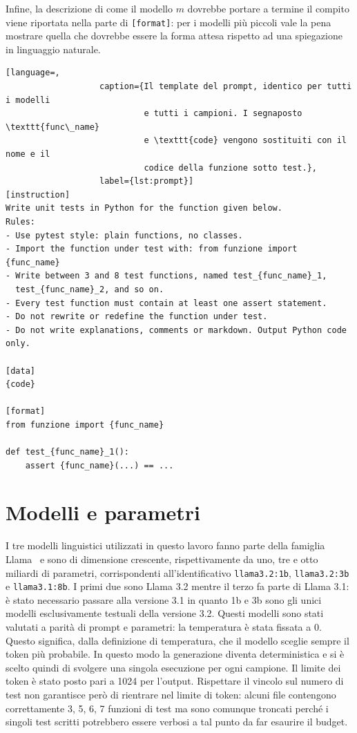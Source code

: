 Infine, la descrizione di come il modello $m$ dovrebbe portare a termine il compito viene riportata nella parte di \texttt{[format]}: per i modelli più piccoli vale la pena mostrare quella che dovrebbe essere la forma attesa rispetto ad una spiegazione in linguaggio naturale.

\begin{lstlisting}[language=,
                   caption={Il template del prompt, identico per tutti i modelli
                            e tutti i campioni. I segnaposto \texttt{func\_name}
                            e \texttt{code} vengono sostituiti con il nome e il
                            codice della funzione sotto test.},
                   label={lst:prompt}]
[instruction]
Write unit tests in Python for the function given below.
Rules:
- Use pytest style: plain functions, no classes.
- Import the function under test with: from funzione import {func_name}
- Write between 3 and 8 test functions, named test_{func_name}_1,
  test_{func_name}_2, and so on.
- Every test function must contain at least one assert statement.
- Do not rewrite or redefine the function under test.
- Do not write explanations, comments or markdown. Output Python code only.

[data]
{code}

[format]
from funzione import {func_name}

def test_{func_name}_1():
    assert {func_name}(...) == ...
\end{lstlisting}


\section{Modelli e parametri}

I tre modelli linguistici utilizzati in questo lavoro fanno parte della famiglia Llama~\cite{llama3herd} e sono di dimensione crescente, rispettivamente da uno, tre e otto miliardi di parametri, corrispondenti all'identificativo \texttt{llama3.2:1b}, \texttt{llama3.2:3b} e \texttt{llama3.1:8b}. I primi due sono Llama 3.2 mentre il terzo fa parte di Llama 3.1: è stato necessario passare alla versione 3.1 in quanto 1b e 3b sono gli unici modelli esclusivamente testuali della versione 3.2.
Questi modelli sono stati valutati a parità di prompt e parametri: la temperatura è stata fissata a 0. Questo significa, dalla definizione di temperatura, che il modello sceglie sempre il token più probabile. In questo modo la generazione diventa deterministica e si è scelto quindi di svolgere una singola esecuzione per ogni campione.
Il limite dei token è stato posto pari a 1024 per l'output. Rispettare il vincolo sul numero di test non garantisce però di rientrare nel limite di token: alcuni file contengono correttamente 3, 5, 6, 7 funzioni di test ma sono comunque troncati perché i singoli test scritti potrebbero essere verbosi a tal punto da far esaurire il budget.

